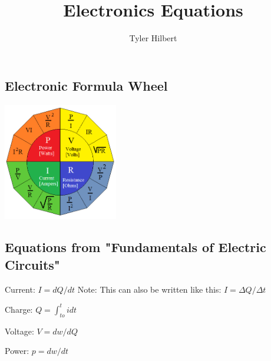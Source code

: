 \documentclass{article}
\begin{document}
	\title{Electronics Equations}
	\author{Tyler Hilbert}
	\date{}
	\maketitle

	\subsection*{Electronic Formula Wheel}
	\includegraphics[width=50mm]{FormulaWheel.png}

	\subsection*{Equations from "Fundamentals of Electric Circuits"}

	Current: $I = dQ/dt$ \smallbreak
	Note: This can also be written like this: $I = \Delta Q / \Delta t$
	\bigskip
	
	Charge: $Q = \int_{to}^{t} i dt$
	\bigskip

	Voltage: $V = dw/dQ$ 
	\bigskip

	Power: $p = dw/dt$ 
	\bigskip
\end{document}
